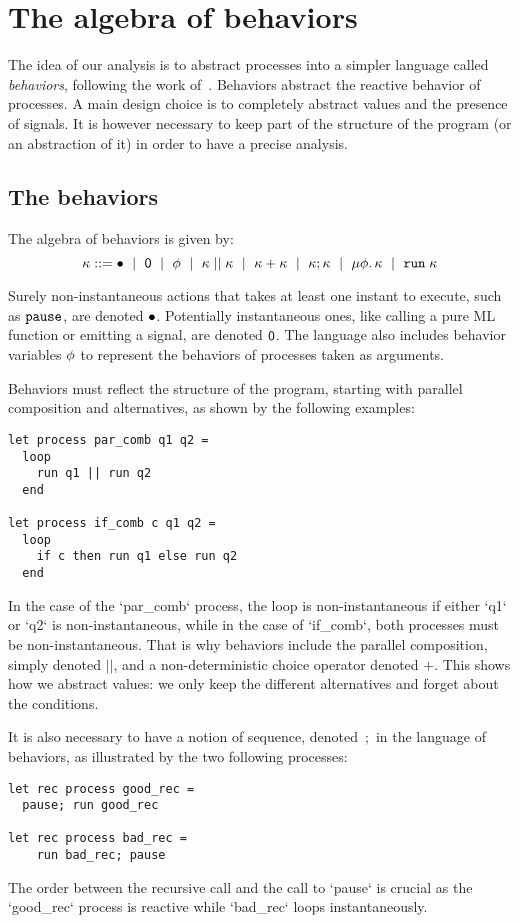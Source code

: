 \documentclass[9pt,preprint]{sigplanconf}
\newcommand{\sdeq}{::=}
\begin{document}
\section{The algebra of behaviors}
\label{sec:behaviors}

The idea of our analysis is to abstract processes into a simpler language called \emph{behaviors}, following the work of~\cite{Amtoft:1999}. Behaviors abstract the reactive behavior of processes. A main design choice is to completely abstract values and the presence of signals. It is however necessary to keep part of the structure of the program (or an abstraction of it) in order to have a precise analysis.

\subsection{The behaviors}

The algebra of behaviors is given by:
\[
\rk \sdeq \effplus ~\mid~ \effmin ~\mid~ \effvar ~\mid~ \effpar{\rk}{\rk} ~\mid~ \effor{\rk}{\rk}
~\mid~ \effcon{\rk}{\rk}  ~\mid~ \effrec{\effvar}{\rk}  ~\mid~ \effrun{\rk}
\]

Surely non-instantaneous actions that takes at least one instant to execute, such as $\mathtt{pause}$, are denoted $\bullet$. Potentially instantaneous ones, like calling a pure ML function or emitting a signal, are denoted $\textsf{0}$. The language also includes behavior variables $\phi$ to represent the behaviors of processes taken as arguments.

Behaviors must reflect the structure of the program, starting with parallel composition and alternatives, as shown by the following examples: 
\begin{lstlisting}
let process par_comb q1 q2 =
  loop
    run q1 || run q2
  end

let process if_comb c q1 q2 =
  loop
    if c then run q1 else run q2
  end
\end{lstlisting}
In the case of the `par_comb` process, the loop is non-instantaneous if either `q1` or `q2` is non-instantaneous, while in the case of `if_comb`, both processes must be non-instantaneous. That is why behaviors include the parallel composition, simply denoted $||$, and a non-deterministic choice operator denoted $+$. This shows how  we abstract values: we only keep the different alternatives and forget about the conditions.

It is also necessary to have a notion of sequence, denoted~$;$ in the language of behaviors, as illustrated by the two following processes:
\begin{lstlisting}
let rec process good_rec =
  pause; run good_rec

let rec process bad_rec =
    run bad_rec; pause
\end{lstlisting}
The order between the recursive call and the call to `pause` is crucial as the `good_rec` process is reactive while `bad_rec` loops instantaneously.
\end{document}
